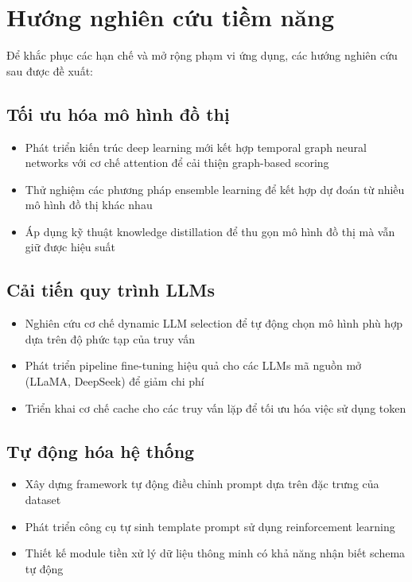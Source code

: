 \section{Hướng nghiên cứu tiềm năng}
Để khắc phục các hạn chế và mở rộng phạm vi ứng dụng, các hướng nghiên cứu sau được đề xuất:

\subsection{Tối ưu hóa mô hình đồ thị}
\begin{itemize}
\item Phát triển kiến trúc deep learning mới kết hợp temporal graph neural networks với cơ chế attention để cải thiện graph-based scoring
\item Thử nghiệm các phương pháp ensemble learning để kết hợp dự đoán từ nhiều mô hình đồ thị khác nhau
\item Áp dụng kỹ thuật knowledge distillation để thu gọn mô hình đồ thị mà vẫn giữ được hiệu suất
\end{itemize}

\subsection{Cải tiến quy trình LLMs}
\begin{itemize}
\item Nghiên cứu cơ chế dynamic LLM selection để tự động chọn mô hình phù hợp dựa trên độ phức tạp của truy vấn
\item Phát triển pipeline fine-tuning hiệu quả cho các LLMs mã nguồn mở (LLaMA, DeepSeek) để giảm chi phí
\item Triển khai cơ chế cache cho các truy vấn lặp để tối ưu hóa việc sử dụng token
\end{itemize}

\subsection{Tự động hóa hệ thống}
\begin{itemize}
\item Xây dựng framework tự động điều chỉnh prompt dựa trên đặc trưng của dataset
\item Phát triển công cụ tự sinh template prompt sử dụng reinforcement learning
\item Thiết kế module tiền xử lý dữ liệu thông minh có khả năng nhận biết schema tự động
\end{itemize}

